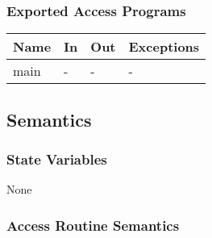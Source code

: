 \documentclass[12pt, titlepage]{article}
\begin{document}
\subsubsection{Exported Access Programs}

\begin{center}
\begin{tabular}{p{2cm} p{4cm} p{4cm} p{2cm}}
\hline
\textbf{Name} & \textbf{In} & \textbf{Out} & \textbf{Exceptions} \\
\hline
main & - & - & - \\
\hline
\end{tabular}
\end{center}

\subsection{Semantics}

\subsubsection{State Variables}

None

\subsubsection{Access Routine Semantics}
\end{document}
